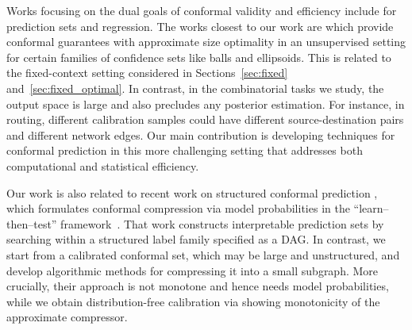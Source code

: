 Works focusing on the dual goals of conformal validity and efficiency include \cite{lei2013distribution,sadinle2016least,izbicki2020flexible,izbicki2022cd,kiyani2024length} for prediction sets and regression. The works closest to our work are \cite{gao2025volume, gao2025highdimensional, gao2026ellipsoid} which provide conformal guarantees with approximate size optimality in an unsupervised setting for certain families of confidence sets like balls and ellipsoids. This is related to the fixed-context setting considered in Sections~\ref{sec:fixed} and~\ref{sec:fixed_optimal}.
In contrast, in the combinatorial tasks we study, the output space is large and also precludes any posterior estimation. For instance, in routing, different calibration samples could have different source-destination pairs and different network edges. Our main contribution is developing techniques for conformal prediction in this more challenging setting that addresses both computational and statistical efficiency.


Our work is also related to recent work on structured conformal prediction \cite{zhang2025conformalstructuredprediction}, which formulates conformal compression via model probabilities in the  ``learn--then--test'' framework~\cite{angelopoulos2022learntestcalibratingpredictive}. That work constructs interpretable prediction sets by searching within a structured label family specified as a DAG. In contrast, we start from a calibrated conformal set, which may be large and unstructured, and develop algorithmic methods for compressing it into a small subgraph. More crucially, their approach is not monotone and hence needs model probabilities, while we obtain distribution-free calibration via showing monotonicity of the approximate compressor. %



